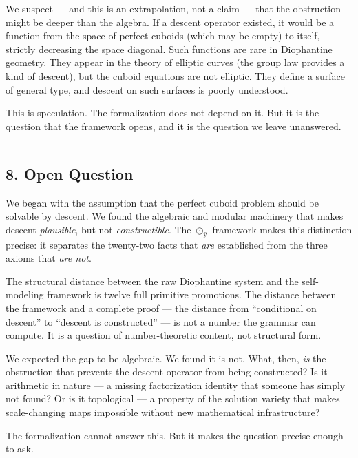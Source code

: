 We suspect --- and this is an extrapolation, not a claim --- that the
obstruction might be deeper than the algebra. If a descent operator
existed, it would be a function from the space of perfect cuboids (which
may be empty) to itself, strictly decreasing the space diagonal. Such
functions are rare in Diophantine geometry. They appear in the theory of
elliptic curves (the group law provides a kind of descent), but the
cuboid equations are not elliptic. They define a surface of general
type, and descent on such surfaces is poorly understood.

This is speculation. The formalization does not depend on it. But it is
the question that the framework opens, and it is the question we leave
unanswered.

\begin{center}\rule{0.5\linewidth}{0.5pt}\end{center}

\subsection{8. Open Question}\label{open-question}

We began with the assumption that the perfect cuboid problem should be
solvable by descent. We found the algebraic and modular machinery that
makes descent \emph{plausible}, but not \emph{constructible}. The
\(\odot_{\text{ÿ}}\) framework makes this distinction precise: it
separates the twenty-two facts that \emph{are} established from the
three axioms that \emph{are not}.

The structural distance between the raw Diophantine system and the
self-modeling framework is twelve full primitive promotions. The
distance between the framework and a complete proof --- the distance
from ``conditional on descent'' to ``descent is constructed'' --- is not
a number the grammar can compute. It is a question of number-theoretic
content, not structural form.

We expected the gap to be algebraic. We found it is not. What, then,
\emph{is} the obstruction that prevents the descent operator from being
constructed? Is it arithmetic in nature --- a missing factorization
identity that someone has simply not found? Or is it topological --- a
property of the solution variety that makes scale-changing maps
impossible without new mathematical infrastructure?

The formalization cannot answer this. But it makes the question precise
enough to ask.
